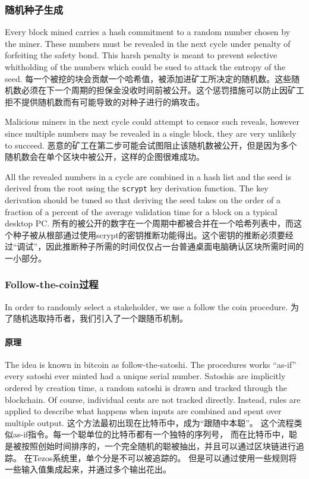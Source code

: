 \documentclass[letterpaper]{article}
\begin{document}
\subsubsection{随机种子生成}

Every block mined carries a hash commitment to a random number chosen by the
miner. These numbers must be revealed in the next cycle under penalty of
forfeiting the safety bond. This harsh penalty is meant to prevent selective
whitholding of the numbers which could be sued to attack the entropy of the seed. 
每一个被挖的块会贡献一个哈希值，被添加进矿工所决定的随机数。这些随机数必须在下一个周期的担保金没收时间前被公开。这个惩罚措施可以防止因矿工拒不提供随机数而有可能导致的对种子进行的熵攻击。

Malicious miners in the next cycle could attempt to censor such reveals, however
since multiple numbers may be revealed in a single block, they are very unlikely
to succeed.
恶意的矿工在第二步可能会试图阻止该随机数被公开，但是因为多个随机数会在单个区块中被公开，这样的企图很难成功。

All the revealed numbers in a cycle are combined in a hash list and the seed is
derived  from the root using the \verb!scrypt! key derivation function. The key
derivation should be tuned so that deriving the seed takes on the order of a
fraction of a percent of the average validation time for a block on a typical
desktop PC.
所有的被公开的数字在一个周期中都被合并在一个哈希列表中，而这个种子被从根部通过使用scrypt的密钥推断功能得出。这个密钥的推断必须要经过“调试”，因此推断种子所需的时间仅仅占一台普通桌面电脑确认区块所需时间的一小部分。

\subsubsection{Follow-the-coin过程}

In order to randomly select a stakeholder, we use a follow the coin procedure.
为了随机选取持币者，我们引入了一个跟随币机制。

\paragraph{原理}
The idea is known in bitcoin as follow-the-satoshi. The procedures works
``as-if'' every satoshi ever minted had a unique serial number. Satoshis are
implicitly ordered by creation time, a random satoshi is drawn and tracked
through the blockchain. Of course, individual cents are not tracked directly.
Instead, rules are applied to describe what happens when inputs are combined and
spent over multiple output.
这个方法最初出现在比特币中，成为“跟随中本聪”。
这个流程类似as-if指令。每一个聪单位的比特币都有一个独特的序列号，
而在比特币中，聪是被按照创始时间排序的，一个完全随机的聪被抽出，并且可以通过区块链进行追踪。
在Tezos系统里，单个分是不可以被追踪的。
但是可以通过使用一些规则将一些输入值集成起来，并通过多个输出花出。
\end{document}
